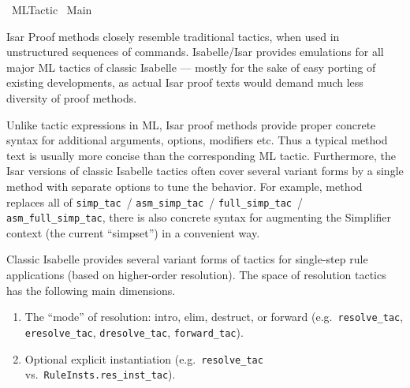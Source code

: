 %
\begin{isabellebody}%
\def\isabellecontext{ML{\isacharunderscore}Tactic}%
%
\isadelimtheory
\isanewline
\isanewline
%
\endisadelimtheory
%
\isatagtheory
{}\isamarkupfalse%
\ ML{\isacharunderscore}Tactic\isanewline
{}\ Main\isanewline
{}%
\endisatagtheory
{\isafoldtheory}%
%
\isadelimtheory
%
\endisadelimtheory
%
\isamarkuptrue%
%
\begin{isamarkuptext}%
Isar Proof methods closely resemble traditional tactics, when used
  in unstructured sequences of \hyperlink{command.apply}{\mbox{}} commands.
  Isabelle/Isar provides emulations for all major ML tactics of
  classic Isabelle --- mostly for the sake of easy porting of existing
  developments, as actual Isar proof texts would demand much less
  diversity of proof methods.

  Unlike tactic expressions in ML, Isar proof methods provide proper
  concrete syntax for additional arguments, options, modifiers etc.
  Thus a typical method text is usually more concise than the
  corresponding ML tactic.  Furthermore, the Isar versions of classic
  Isabelle tactics often cover several variant forms by a single
  method with separate options to tune the behavior.  For example,
  method \hyperlink{method.simp}{\mbox{}} replaces all of \verb|simp_tac|~/ \verb|asm_simp_tac|~/ \verb|full_simp_tac|~/ \verb|asm_full_simp_tac|, there
  is also concrete syntax for augmenting the Simplifier context (the
  current ``simpset'') in a convenient way.%
\end{isamarkuptext}%
\isamarkuptrue%
%
\isamarkuptrue%
%
\begin{isamarkuptext}%
Classic Isabelle provides several variant forms of tactics for
  single-step rule applications (based on higher-order resolution).
  The space of resolution tactics has the following main dimensions.

  \begin{enumerate}

  \item The ``mode'' of resolution: intro, elim, destruct, or forward
  (e.g.\ \verb|resolve_tac|, \verb|eresolve_tac|, \verb|dresolve_tac|,
  \verb|forward_tac|).

  \item Optional explicit instantiation (e.g.\ \verb|resolve_tac| vs.\
  \verb|RuleInsts.res_inst_tac|).


\end{enumerate}
\end{isamarkuptext}
\end{isabellebody}
